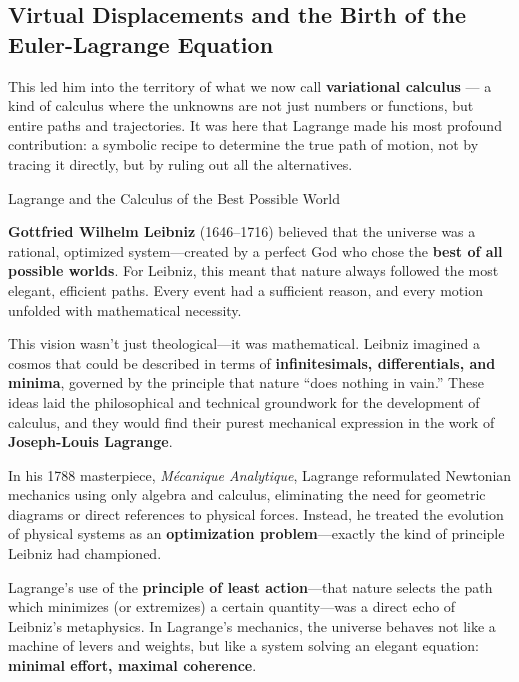 \subsection{Virtual Displacements and the Birth of the Euler-Lagrange Equation}

This led him into the territory of what we now call \textbf{variational calculus} — a kind of calculus where the unknowns are not just numbers or functions, but entire paths and trajectories. It was here that Lagrange made his most profound contribution: a symbolic recipe to determine the true path of motion, not by tracing it directly, but by ruling out all the alternatives.


\medskip

\begin{HistoricalSidebar}{Lagrange and the Calculus of the Best Possible World}
    
        \textbf{Gottfried Wilhelm Leibniz} (1646–1716) believed that the universe was a rational, optimized system—created by a perfect God who chose the \textbf{best of all possible worlds}. For Leibniz, this meant that nature always followed the most elegant, efficient paths. Every event had a sufficient reason, and every motion unfolded with mathematical necessity.
    
        \medskip
    
        This vision wasn’t just theological—it was mathematical. Leibniz imagined a cosmos that could be described in terms of \textbf{infinitesimals, differentials, and minima}, governed by the principle that nature “does nothing in vain.” These ideas laid the philosophical and technical groundwork for the development of calculus, and they would find their purest mechanical expression in the work of \textbf{Joseph-Louis Lagrange}.
    
        \medskip
    
        In his 1788 masterpiece, \textit{Mécanique Analytique}, Lagrange reformulated Newtonian mechanics using only algebra and calculus, eliminating the need for geometric diagrams or direct references to physical forces. Instead, he treated the evolution of physical systems as an \textbf{optimization problem}—exactly the kind of principle Leibniz had championed.
    
        \medskip
    
        Lagrange’s use of the \textbf{principle of least action}—that nature selects the path which minimizes (or extremizes) a certain quantity—was a direct echo of Leibniz’s metaphysics. In Lagrange’s mechanics, the universe behaves not like a machine of levers and weights, but like a system solving an elegant equation: \textbf{minimal effort, maximal coherence}.
    

\end{HistoricalSidebar}
